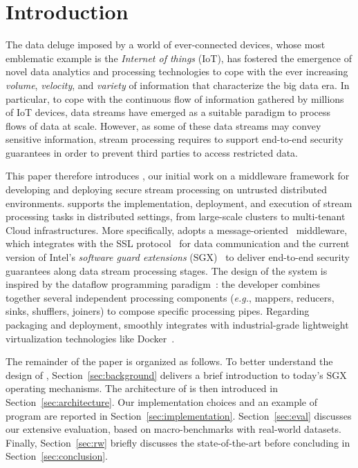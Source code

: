 \section{Introduction}\label{sec:introduction}
The data deluge imposed by a world of ever-connected devices, whose most emblematic example is the \emph{Internet of things} (IoT), has fostered the emergence of novel data analytics and processing technologies to cope with the ever increasing \emph{volume}, \emph{velocity}, and \emph{variety} of information that characterize the big data era.
In particular, to cope with the continuous flow of information gathered by millions of IoT devices, data streams have emerged as a suitable paradigm to process flows of data at scale.
However, as some of these data streams may convey sensitive information, stream processing requires to support end-to-end security guarantees in order to prevent third parties to access restricted data.

This paper therefore introduces \SYS{}, our initial work on a middleware framework for developing and deploying secure stream processing on untrusted distributed environments.
\SYS{} supports the implementation, deployment, and execution of stream processing tasks in distributed settings, from large-scale clusters to multi-tenant Cloud infrastructures.
More specifically, \SYS{} adopts a message-oriented~\cite{mom} middleware, which integrates with the SSL protocol~\cite{freier2011secure} for data communication and the current version of Intel's \emph{software guard extensions} (SGX)~\cite{costan_intel} to deliver end-to-end security guarantees along data stream processing stages.
The design of the \SYS{} system is inspired by the dataflow programming paradigm~\cite{uustalu_essence_2005}: the developer combines together several independent processing components (\emph{e.g.}, mappers, reducers, sinks, shufflers, joiners) to compose specific processing pipes.
Regarding packaging and deployment, \SYS{} smoothly integrates with industrial-grade lightweight virtualization technologies like Docker~\cite{docker}.


The remainder of the paper is organized as follows.
To better understand the design of \SYS, Section~\ref{sec:background} delivers a brief introduction to today's SGX operating mechanisms.
The architecture of \SYS{} is then introduced in Section~\ref{sec:architecture}.
Our implementation choices and an example of \SYS{} program are reported in Section~\ref{sec:implementation}.
Section~\ref{sec:eval} discusses our extensive evaluation, based on macro-benchmarks with real-world datasets.
Finally, Section~\ref{sec:rw} briefly discusses the state-of-the-art before concluding in Section~\ref{sec:conclusion}.

